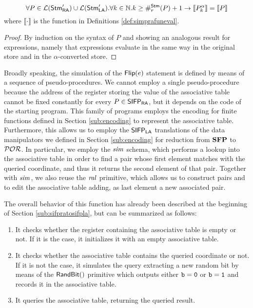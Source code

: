 \begin{remark}
  \label{rem:progalpha}
  $$
  \forall P \in {\mathcal L ({\mathsf{Stm}_{\mathsf{RA}}'})}\cup {\mathcal L ({\mathsf{Stm}_{\mathsf{LA}}'})}. \forall k \in \mathbb{N}.
  k\ge \#_r^{\mathsf{Stm}}(P)+1\to \llbracket P^\alpha_k\rrbracket =\llbracket P\rrbracket
  $$
  where $\llbracket \cdot \rrbracket$ is the function in Definitions \ref{def:simprafuneval}.
\end{remark}
\begin{proof}
  By induction on the syntax of $P$ and showing an analogous result for expressions,
  namely that expressions evaluate in the same way in the original store and in the
  $\alpha$-converted store.
\end{proof}

Broadly speaking, the simulation of the $\mathsf{Flip(}e\mathsf{)} $ statement is defined by means of a
sequence of pseudo-procedures. We cannot employ a single pseudo-procedure because
the address of the register storing the value of the associative table cannot be
fixed constantly for every $P \in\mathsf{SIFP_{{\mathsf{RA}}}}$, but it depends on the code of the
starting program.
%
This family of programs employs the encoding
for finite functions defined in Section \ref{sub:encoding} to represent
the associative table. Furthermore, this allows
us to employ the $\mathsf{SIFP_{{\mathsf{LA}}}}$ translations of the data manipulators
we defined in Section \ref{sub:encoding} for reduction from $\mathbf{SFP}$ to $\mathcal{POR}$.
In particular, we employ
the $\mathit{sim}$ schema, which performs a lookup into the associative
table in order to find a pair whose first element matches with the
queried coordinate, and thus it returns the second element of that pair.
%
Together with $\mathit{sim}$, we also reuse the $\mathit{ral}$ primitive, which allows us to
construct pairs and to edit the associative table adding, as last element a new
associated pair.

The overall behavior of this function has already been described at the beginning
of Section \ref{sub:sifpratosifpla}, but can be summarized as follows:

\begin{enumerate}
  \item It checks whether the register containing the associative
  table is empty or not. If it is the case, it initializes it with an empty associative table.
  \item It checks whether the associative table contains the queried coordinate or not. If it is not the case, it simulates the query extracting a new random bit by means of the $\mathsf{RandBit()}$ primitive which outputs either $\mathtt{b}=\mathtt{0}$ or
  $\mathtt{b}=\mathtt{1}$ and records it in the associative table.
  \item It queries the associative table, returning the queried result.
\end{enumerate}


